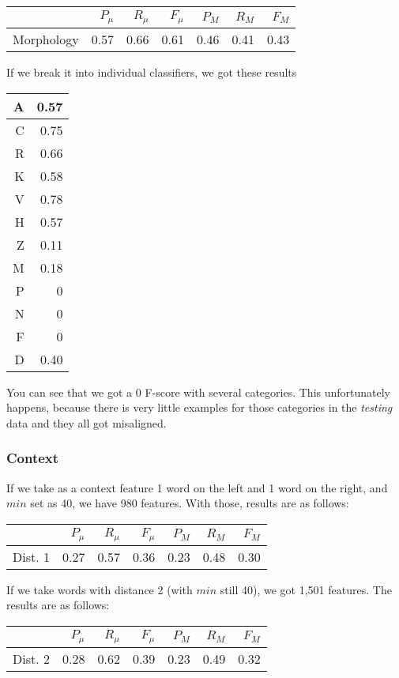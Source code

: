 \documentclass[letterpaper]{article}
\begin{document}
\begin{tabular}{|r|r|r|r|r|r|r|}
 \hline
 & $P_\mu$ & $R_\mu$ & $F_\mu$ & $P_M$ & $R_M$  & $F_M$ \\ \hline
Morphology & 0.57 & 0.66 & 0.61 & 0.46 & 0.41 & 0.43 \\ \hline
\end{tabular}

If we break it into individual classifiers, we got these results


\begin{tabular}{|r|r|}
\hline
A & 0.57 \\ \hline
    C & 0.75 \\ \hline
    R & 0.66 \\ \hline
    K & 0.58 \\ \hline
    V & 0.78 \\ \hline
    H & 0.57 \\ \hline
    Z & 0.11 \\ \hline
    M & 0.18 \\ \hline
    P & 0 \\ \hline
    N & 0 \\ \hline
    F & 0 \\ \hline
    D & 0.40 \\ \hline

\end{tabular}

You can see that we got a 0 F-score with several categories. This unfortunately happens, because there is very little examples for those categories in the \emph{testing} data and they all got misaligned.

\subsubsection{Context}
If we take as a context feature 1 word on the left and 1 word on the right, and $min$ set as 40, we have 980 features. With those, results are as follows:


\begin{tabular}{|r|r|r|r|r|r|r|}
 \hline
 & $P_\mu$ & $R_\mu$ & $F_\mu$ & $P_M$ & $R_M$  & $F_M$ \\ \hline
Dist. 1 & 0.27 & 0.57 & 0.36 & 0.23 & 0.48 & 0.30 \\ \hline
\end{tabular}


If we take words with distance 2 (with $min$ still 40), we got 1,501 features. The results are as follows:

\begin{tabular}{|r|r|r|r|r|r|r|}
 \hline
 & $P_\mu$ & $R_\mu$ & $F_\mu$ & $P_M$ & $R_M$  & $F_M$ \\ \hline
Dist. 2 & 0.28 & 0.62 & 0.39 & 0.23 & 0.49 & 0.32 \\ \hline
\end{tabular}
\end{document}
